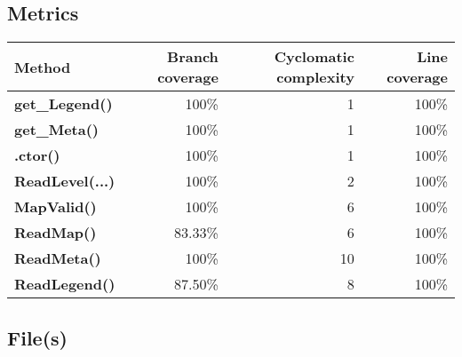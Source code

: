 \documentclass[a4paper,landscape,10pt]{article}
\begin{document}
\subsection{Metrics}
\begin{longtable}[l]{|l|r|r|r|}
\hline
\textbf{Method} & \textbf{Branch coverage} & \textbf{Cyclomatic complexity} & \textbf{Line coverage}\\
\hline
\textbf{get\_Legend()} & 100\% & 1 & 100\%\\
\hline
\textbf{get\_Meta()} & 100\% & 1 & 100\%\\
\hline
\textbf{.ctor()} & 100\% & 1 & 100\%\\
\hline
\textbf{ReadLevel(...)} & 100\% & 2 & 100\%\\
\hline
\textbf{MapValid()} & 100\% & 6 & 100\%\\
\hline
\textbf{ReadMap()} & 83.33\% & 6 & 100\%\\
\hline
\textbf{ReadMeta()} & 100\% & 10 & 100\%\\
\hline
\textbf{ReadLegend()} & 87.50\% & 8 & 100\%\\
\hline
\end{longtable}
\subsection{File(s)}
\end{document}
